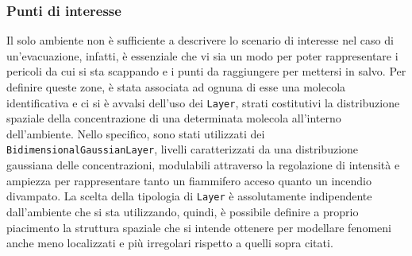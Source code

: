 \subsubsection{Punti di interesse}
Il solo ambiente non è sufficiente a descrivere lo scenario di interesse nel caso di un'evacuazione, infatti, è essenziale che vi sia un modo per poter rappresentare i pericoli da cui si sta scappando e i punti da raggiungere per mettersi in salvo. \newline
Per definire queste zone, è stata associata ad ognuna di esse una molecola identificativa e ci si è avvalsi dell'uso dei \texttt{Layer}, strati costitutivi la distribuzione spaziale della concentrazione di una determinata molecola all'interno dell'ambiente. \newline 
Nello specifico, sono stati utilizzati dei \texttt{BidimensionalGaussianLayer}, livelli caratterizzati da una distribuzione gaussiana delle concentrazioni, modulabili attraverso la regolazione di intensità e ampiezza per rappresentare tanto un fiammifero acceso quanto un incendio divampato. \newline
La scelta della tipologia di \texttt{Layer} è assolutamente indipendente dall'ambiente che si sta utilizzando, quindi, è possibile definire a proprio piacimento la struttura spaziale che si intende ottenere per modellare fenomeni anche meno localizzati e più irregolari rispetto a quelli sopra citati.

